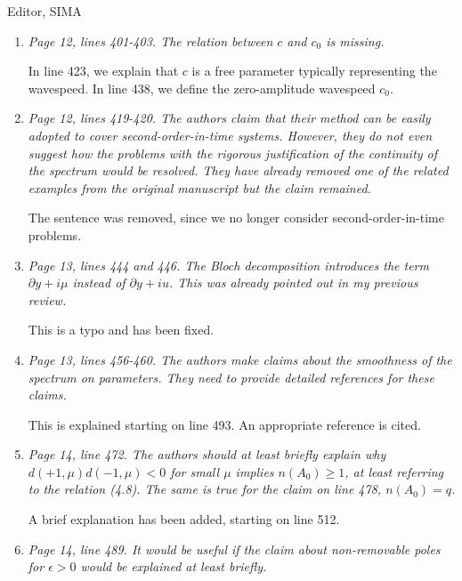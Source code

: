 \documentclass[11pt]{letter}
\begin{document}
\begin{letter}{Editor, SIMA}
\begin{enumerate}
\item \emph{Page 12, lines 401-403. The relation between $c$ and $c_0$ is missing.}
\vspace{4mm}

In line 423, we explain that $c$ is a free parameter typically representing the wavespeed. In line 438, we define the zero-amplitude wavespeed $c_0$.

\item \emph{Page 12, lines 419-420. The authors claim that their method can be easily adopted to cover second-order-in-time systems. However, they do not even suggest how the problems with the rigorous justification of the continuity of the spectrum would be resolved. They have already removed one of the related examples from the original manuscript but the claim remained.}
\vspace{4mm}

The sentence was removed, since we no longer consider second-order-in-time problems.

\item \emph{Page 13, lines 444 and 446. The Bloch decomposition introduces the term $\partial y + i \mu$ instead of $\partial y + i u$. This was already pointed out in my previous review.}
\vspace{4mm}

This is a typo and has been fixed.

\item \emph{Page 13, lines 456-460. The authors make claims about the smoothness of the spectrum on parameters. They need to provide detailed references for these claims.}
\vspace{4mm}

This is explained starting on line 493. An appropriate reference is cited.

\item \emph{Page 14, line 472. The authors should at least briefly explain why $d(+1,\mu)d(-1,\mu) < 0$ for small $\mu$ implies $n(A_0) \geq 1$, at least referring to the relation (4.8). The same is true for the claim on line 478, $n(A_0) = q$.}
\vspace{4mm}

A brief explanation has been added, starting on line 512.

\item \emph{Page 14, line 489. It would be useful if the claim about non-removable poles for $\epsilon > 0$ would be explained at least briefly.}
\vspace{4mm}


\end{enumerate}
\end{letter}
\end{document}

